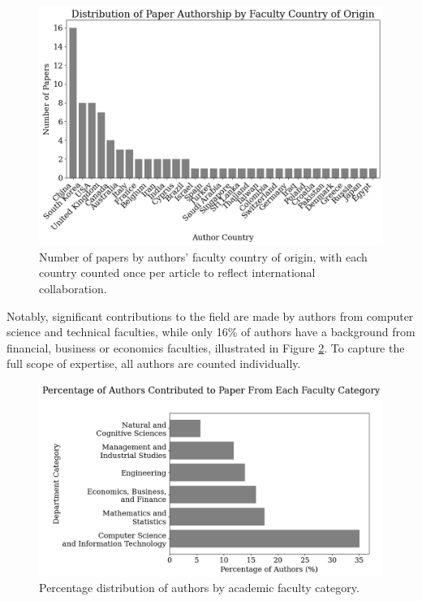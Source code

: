 \begin{figure}[H]
    \centering
    \includegraphics[width=1\linewidth]{Images/author_country_origin_per_paper.png}
    \caption[Number of papers by authors’ faculty country of origin]{Number of papers by authors' faculty country of origin, with each country counted once per article to reflect international collaboration.}
    \label{fig:author_country_origin_per_paper}
\end{figure}

Notably, significant contributions to the field are made by authors from computer science and technical faculties, while only 16\% of authors have a background from financial, business or economics faculties, illustrated in Figure \ref{fig:author_faculty_origin}. To capture the full scope of expertise, all authors are counted individually. 

\begin{figure}[H]
    \centering
    \includegraphics[width=1\linewidth]{Images/author_faculty_origin.png}
    \caption[Percentage distribution of contributing authors by academic faculty category]{Percentage distribution of authors by academic faculty category.}
    \label{fig:author_faculty_origin}
\end{figure}

